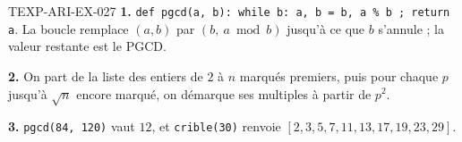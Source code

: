 % 
% 
% 
\begin{corrige}{TEXP-ARI-EX-027}
\textbf{1.} \texttt{def pgcd(a, b): while b: a, b = b, a \% b ; return a}.
La boucle remplace $(a,b)$ par $(b,\ a\bmod b)$ jusqu'à ce que $b$ s'annule ;
la valeur restante est le PGCD.

\textbf{2.} On part de la liste des entiers de $2$ à $n$ marqués premiers, puis
pour chaque $p$ jusqu'à $\sqrt{n}$ encore marqué, on démarque ses multiples
à partir de $p^2$.

\textbf{3.} \texttt{pgcd(84, 120)} vaut $12$, et \texttt{crible(30)} renvoie
$[2,3,5,7,11,13,17,19,23,29]$.
\end{corrige}
